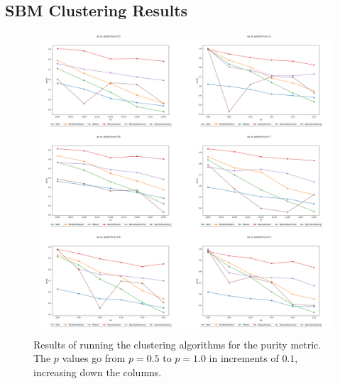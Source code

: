 \documentclass{article}
\begin{document}
\subsection{SBM Clustering Results}
\begin{figure}[H]
    \label{fig:results_purity}
    \centering
    \includegraphics[width=1.15\textwidth]{results/results_purity.png}
    \caption[Clustering purity results]{Results of running the clustering algorithms for the purity metric. The $p$ values go from $p=0.5$ to $p=1.0$ in increments of $0.1$, increasing down the columns.}
\end{figure}
\end{document}
